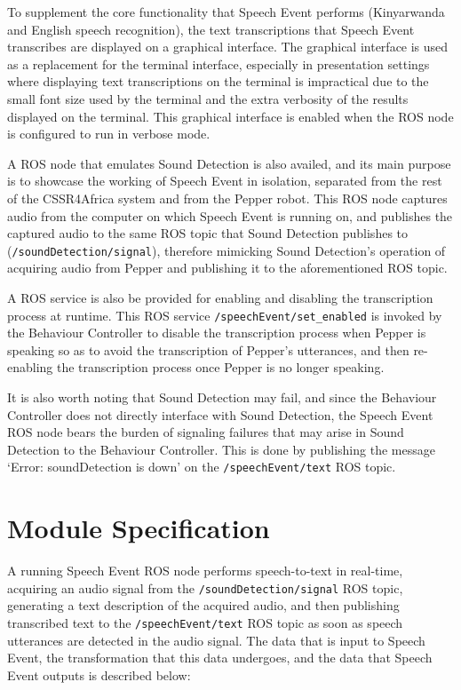 \documentclass{CSSRforAfrica}
\begin{document}
To supplement the core functionality that Speech Event performs (Kinyarwanda and English speech recognition), the text transcriptions that Speech Event transcribes are displayed on a graphical interface. The graphical interface is used as a replacement for the terminal interface, especially in presentation settings where displaying text transcriptions on the terminal is impractical due to the small font size used by the terminal and the extra verbosity of the results displayed on the terminal. This graphical interface is enabled when the ROS node is configured to run in verbose mode.

A ROS node that emulates Sound Detection is also availed, and its main purpose is to showcase the working of Speech Event in isolation, separated from the rest of the CSSR4Africa system and from the Pepper robot. This ROS node captures audio from the computer on which Speech Event is running on, and publishes the captured audio to the same ROS topic that Sound Detection publishes to (\texttt{/soundDetection/signal}), therefore mimicking Sound Detection's operation of acquiring audio from Pepper and publishing it to the aforementioned ROS topic.

A ROS service is also be provided for enabling and disabling the transcription process at runtime. This ROS service \texttt{/speechEvent/set\_enabled} is invoked by the Behaviour Controller to disable the transcription process when Pepper is speaking so as to avoid the transcription of Pepper's utterances, and then re-enabling the transcription process once Pepper is no longer speaking.

It is also worth noting that Sound Detection may fail, and since the Behaviour Controller does not directly interface with Sound Detection, the Speech Event ROS node bears the burden of signaling failures that may arise in Sound Detection to the Behaviour Controller. This is done by publishing the message `Error: soundDetection is down' on the \texttt{/speechEvent/text} ROS topic.


\newpage
\section{Module Specification}
A running Speech Event ROS node performs speech-to-text in real-time, acquiring an audio signal from the \texttt{/soundDetection/signal} ROS topic, generating a text description of the acquired audio, and then publishing transcribed text to the \texttt{/speechEvent/text} ROS topic as soon as speech utterances are detected in the audio signal. The data that is input to Speech Event, the transformation that this data undergoes, and the data that Speech Event outputs is described below:
\end{document}
